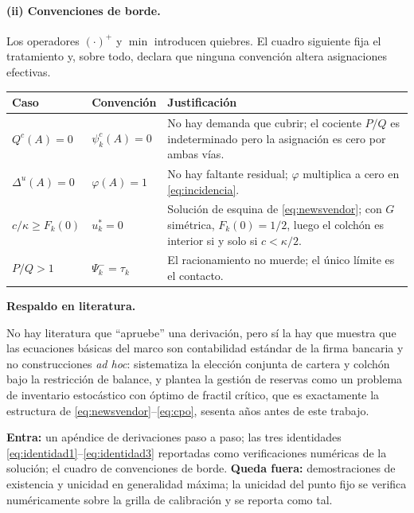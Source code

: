 \documentclass[11pt]{article}
\newcommand{\lit}{\par\noindent\textbf{Respaldo en literatura.}\par}
\theoremstyle{definition}
\begin{document}
\paragraph{(ii) Convenciones de borde.} Los operadores $(\cdot)^+$ y $\min$
introducen quiebres. El cuadro siguiente fija el tratamiento y, sobre todo,
declara que ninguna convenci\'on altera asignaciones efectivas.

\begin{center}
\begin{tabular}{@{}p{3.2cm}p{3.6cm}p{7.4cm}@{}}
\toprule
\textbf{Caso} & \textbf{Convenci\'on} & \textbf{Justificaci\'on} \\
\midrule
$Q^c(A)=0$ & $\psi^c_k(A)=0$ & No hay demanda que cubrir; el cociente $P/Q$ es
indeterminado pero la asignaci\'on es cero por ambas v\'ias. \\
$\Delta^u(A)=0$ & $\varphi(A)=1$ & No hay faltante residual; $\varphi$ multiplica
a cero en \eqref{eq:incidencia}. \\
$c/\kappa\ge F_k(0)$ & $u^*_k=0$ & Soluci\'on de esquina de \eqref{eq:newsvendor};
con $G$ sim\'etrica, $F_k(0)=1/2$, luego el colch\'on es interior si y solo si
$c<\kappa/2$. \\
$P/Q>1$ & $\Psi^-_k=\tau_k$ & El racionamiento no muerde; el \'unico l\'imite es
el contacto. \\
\bottomrule
\end{tabular}
\end{center}

\lit
No hay literatura que ``apruebe'' una derivaci\'on, pero s\'i la hay que muestra
que las ecuaciones b\'asicas del marco son contabilidad est\'andar de la firma
bancaria y no construcciones \emph{ad hoc}: \citet{baltensperger1980} sistematiza
la elecci\'on conjunta de cartera y colch\'on bajo la restricci\'on de balance, y
\citet{poole1968} plantea la gesti\'on de reservas como un problema de inventario
estoc\'astico con \'optimo de fractil cr\'itico, que es exactamente la estructura
de \eqref{eq:newsvendor}--\eqref{eq:cpo}, sesenta a\~nos antes de este trabajo.

\begin{ie2}
\textbf{Entra:} un ap\'endice de derivaciones paso a paso; las tres identidades
\eqref{eq:identidad1}--\eqref{eq:identidad3} reportadas como verificaciones
num\'ericas de la soluci\'on; el cuadro de convenciones de borde.
\textbf{Queda fuera:} demostraciones de existencia y unicidad en generalidad
m\'axima; la unicidad del punto fijo se verifica num\'ericamente sobre la grilla
de calibraci\'on y se reporta como tal.
\end{ie2}
\end{document}
